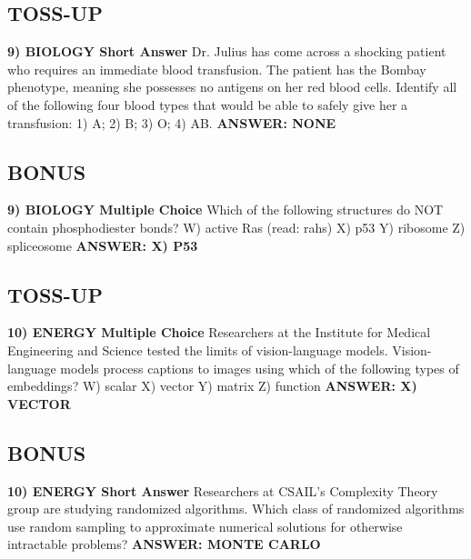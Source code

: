 \documentclass{article}
\begin{document}
\subsection*{TOSS-UP}
\textbf{9) BIOLOGY Short Answer} Dr. Julius has come across a shocking patient who requires an immediate blood transfusion. The patient has the Bombay phenotype, meaning she possesses no antigens on her red blood cells. Identify all of the following four blood types that would be able to safely give her a transfusion: 1) A; 2) B; 3) O; 4) AB.
\newline
\textbf{ANSWER: NONE}

\subsection*{BONUS}
\textbf{9) BIOLOGY Multiple Choice} Which of the following structures do NOT contain phosphodiester bonds?
\newline
W) active Ras (read: rahs)
\newline
X) p53
\newline
Y) ribosome
\newline
Z) spliceosome
\newline
\textbf{ANSWER: X) P53}

\subsection*{TOSS-UP}
\textbf{10) ENERGY Multiple Choice} Researchers at the Institute for Medical Engineering and Science tested the limits of vision-language models. Vision-language models process captions to images using which of the following types of embeddings?
\newline
W) scalar
\newline
X) vector
\newline
Y) matrix
\newline
Z) function
\newline
\textbf{ANSWER: X) VECTOR}

\subsection*{BONUS}
\textbf{10) ENERGY Short Answer} Researchers at CSAIL's Complexity Theory group are studying randomized algorithms. Which class of randomized algorithms use random sampling to approximate numerical solutions for otherwise intractable problems?
\newline
\textbf{ANSWER: MONTE CARLO}
\end{document}

